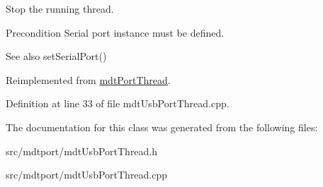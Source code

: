 Stop the running thread. 

\begin{DoxyPrecond}{Precondition}
Serial port instance must be defined. 
\end{DoxyPrecond}
\begin{DoxySeeAlso}{See also}
setSerialPort() 
\end{DoxySeeAlso}


Reimplemented from \hyperlink{classmdt_port_thread_a5746ea96689ed80179751ad1353f0b39}{mdtPortThread}.



Definition at line 33 of file mdtUsbPortThread.cpp.



The documentation for this class was generated from the following files:\begin{DoxyCompactItemize}
\item 
src/mdtport/mdtUsbPortThread.h\item 
src/mdtport/mdtUsbPortThread.cpp\end{DoxyCompactItemize}
